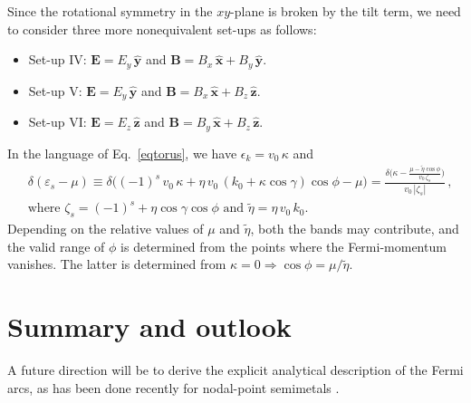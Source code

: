 \documentclass[aps,prb,onecolumn, footinbib, 10pt]{revtex4-2}
\def \nn{\nonumber \\}
\begin{document}
Since the rotational symmetry in the $xy$-plane is broken by the tilt term, we need to consider three more nonequivalent set-ups as follows:
\begin{itemize}

\item Set-up IV: $ \mathbf{E} = E_y\, {\mathbf{\hat y}}$ and $\mathbf{B} = B_x\,{\mathbf{\hat x}} + B_y\,{\mathbf{\hat y}}$.

\item Set-up V: $\mathbf{E} = E_y \,{\mathbf{\hat y}}$ and $ \mathbf{B} = B_x\,{\mathbf{\hat x}} + B_z \,{\mathbf{\hat z}} $.

\item Set-up VI: $\mathbf{E}= E_z\,{\mathbf{\hat z}}$ and $\mathbf{B} = B_y\,{\mathbf{\hat x}} + B_z \,{\mathbf{\hat z}}$.

\end{itemize}
In the language of Eq.~\eqref{eqtorus}, we have $\epsilon_k =  v_0 \, \kappa $ and
\begin{align} 
&\delta (\varepsilon_s -\mu)  \equiv 
\delta \Big (  (-1)^s\,v_0 \,\kappa + \eta \,v_0\, (k_0 + \kappa \cos \gamma) \cos \phi -\mu \Big )
= \frac{\delta \Big ( \kappa - \frac{\mu - \tilde \eta \cos \phi } { v_0\,\zeta_s } \Big )}
{ v_0 \,|\zeta_s| } \,,
\nn & \text{where }
\zeta_s = (-1)^s  + \eta  \cos \gamma \cos \phi
\text{ and } \tilde \eta = \eta\,v_0\,k_0.
\end{align}
Depending on the relative values of $\mu$ and $ \tilde \eta $, both the bands may contribute, and the valid range of $\phi $ is determined from the points where the Fermi-momentum vanishes. The latter is determined from $\kappa = 0 \Rightarrow  \cos \phi  =  \mu /\tilde \eta $. 




\section{Summary and outlook}
\label{secsum}

A future direction will be to derive the explicit analytical description of the Fermi arcs, as has been done recently for nodal-point semimetals \cite{ips-fa}.






 
\end{document}
